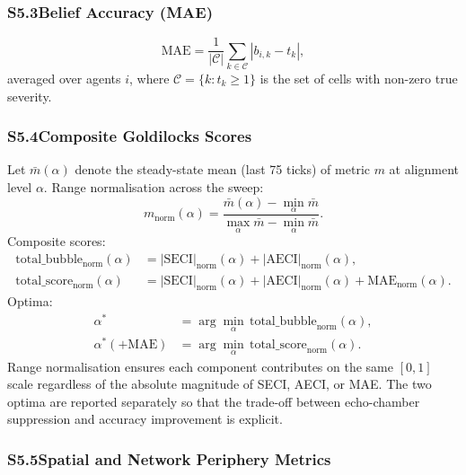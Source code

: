 \documentclass[pdflatex,sn-apa]{sn-jnl}%
\begin{document}
\begin{appendices}
\subsubsection*{S5.3\enspace Belief Accuracy (MAE)}

\begin{equation}
  \mathrm{MAE} = \frac{1}{|\mathcal{C}|}\sum_{k\in\mathcal{C}}|b_{i,k}-t_k|,
  \tag{S7}
\end{equation}
%
averaged over agents $i$, where $\mathcal{C}=\{k:t_k\geq1\}$ is the set of
cells with non-zero true severity.

\subsubsection*{S5.4\enspace Composite Goldilocks Scores}

Let $\bar{m}(\alpha)$ denote the steady-state mean (last 75 ticks) of metric $m$
at alignment level $\alpha$.
Range normalisation across the sweep:
%
\begin{equation}
  m_{\mathrm{norm}}(\alpha) =
    \frac{\bar{m}(\alpha)-\min_{\alpha}\bar{m}}
         {\max_{\alpha}\bar{m}-\min_{\alpha}\bar{m}}.
  \tag{S8}
\end{equation}
%
Composite scores:
%
\begin{align}
  \text{total\_bubble}_{\mathrm{norm}}(\alpha)
    &= |\mathrm{SECI}|_{\mathrm{norm}}(\alpha)
       +|\mathrm{AECI}|_{\mathrm{norm}}(\alpha), \tag{S9}\\
  \text{total\_score}_{\mathrm{norm}}(\alpha)
    &= |\mathrm{SECI}|_{\mathrm{norm}}(\alpha)
       +|\mathrm{AECI}|_{\mathrm{norm}}(\alpha)
       +\mathrm{MAE}_{\mathrm{norm}}(\alpha). \tag{S10}
\end{align}
%
Optima:
%
\begin{align}
  \alpha^* &= \arg\min_{\alpha}\,\text{total\_bubble}_{\mathrm{norm}}(\alpha), \tag{S11}\\
  \alpha^*(+\mathrm{MAE}) &= \arg\min_{\alpha}\,\text{total\_score}_{\mathrm{norm}}(\alpha). \tag{S12}
\end{align}
%
Range normalisation ensures each component contributes on the same $[0,1]$ scale
regardless of the absolute magnitude of SECI, AECI, or MAE.
The two optima are reported separately so that the trade-off between
echo-chamber suppression and accuracy improvement is explicit.

\subsubsection*{S5.5\enspace Spatial and Network Periphery Metrics}


\end{appendices}
\end{document}
